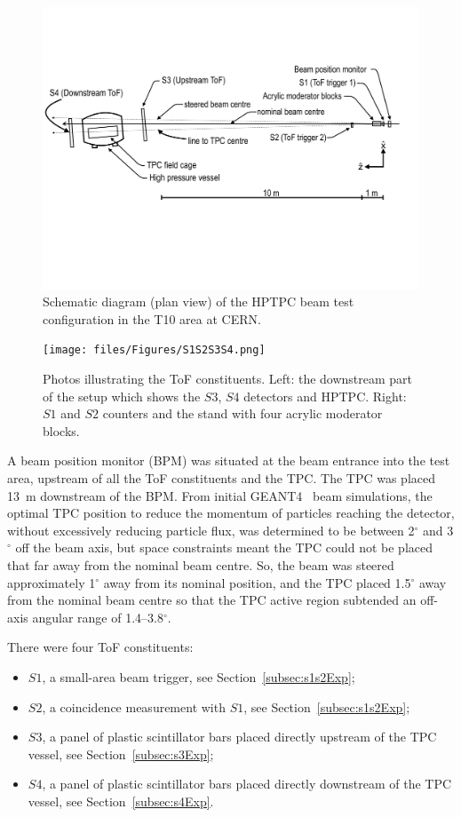 \begin{figure}
  \includegraphics[width=1.0\linewidth]{files/Figures/hptpc_t10_planview.pdf}
  \caption{Schematic diagram (plan view) of the HPTPC beam test configuration in the T10 area at CERN.}
  \label{fig:setup}
\end{figure}
\begin{figure}
  \centering
  \texttt{[image: files/Figures/S1S2S3S4.png]}
  \caption{Photos illustrating the ToF constituents. Left: the downstream part of the setup which shows the $\mathit{S3}$, $\mathit{S4}$ detectors and HPTPC. Right: $\mathit{S1}$ and $\mathit{S2}$ counters and the stand with four acrylic moderator blocks.}
  \label{fig:modblocks}
\end{figure}

A beam position monitor (BPM) was situated at the beam entrance into the test area, upstream of all the ToF constituents and the TPC. 
The TPC was placed 13~m downstream of the BPM. 
From initial GEANT4~\cite{brun1993geant} beam simulations, the optimal TPC position to reduce the momentum of particles reaching the detector, without excessively reducing particle flux, was determined to be between 2$^{ \circ }$ and 3$^{ \circ }$ off the beam axis, but space constraints meant the TPC could not be placed that far away from the nominal beam centre. So, the beam was steered approximately 1$^{ \circ }$ away from its nominal position, and the TPC placed 1.5$^{ \circ }$ away from the nominal beam centre so that the TPC active region subtended an off-axis angular range of 1.4--3.8$^{ \circ }$.

There were four ToF constituents: 
\begin{itemize}
    \item $\mathit{S1}$, a small-area beam trigger, see Section~\ref{subsec:s1s2Exp};
    \item $\mathit{S2}$, a coincidence measurement with $\mathit{S1}$, see Section~\ref{subsec:s1s2Exp};
    \item $\mathit{S3}$, a panel of plastic scintillator bars placed directly upstream of the TPC vessel, see Section~\ref{subsec:s3Exp};
    \item $\mathit{S4}$, a panel of plastic scintillator bars placed directly downstream of the TPC vessel, see Section~\ref{subsec:s4Exp}.
\end{itemize}

